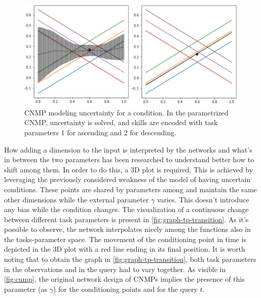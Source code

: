 \begin{figure}
    \centering
    \includegraphics[width=0.8\linewidth]{figures/trajX+tp.png}
    \caption{ CNMP modeling uncertainty for a condition. In the parametrized CNMP, uncertainty is solved, and skills are encoded with task parameters 1 for ascending and 2 for descending. }
    \label{fig:trajX+tp}
\end{figure}
 
How adding a dimension to the input is interpreted by the networks and what's in between the two parameters has been researched to understand better how to shift among them. In order to do this, a 3D plot is required. This is achieved by leveraging the previously considered weakness of the model of having uncertain conditions. These points are shared by parameters among and maintain the same other dimensions while the external parameter $\gamma$ varies. This doesn't introduce any bias while the condition changes. The visualization of a continuous change between different task parameters is present in \cref{fig:graph-tp-transition}. As it's possible to observe, the network interpolates nicely among the functions also in the tasks-parameter space. The movement of the conditioning point in time is depicted in the 3D plot with a red line ending in its final position.
It is worth noting that to obtain the graph in \cref{fig:graph-tp-transition}, both task parameters in the observations and in the query had to vary together. As visible in \cref{fig:cnmp}, the original network design of CNMPs implies the presence of this parameter (as $\gamma$) for the conditioning points and for the query $t$.

